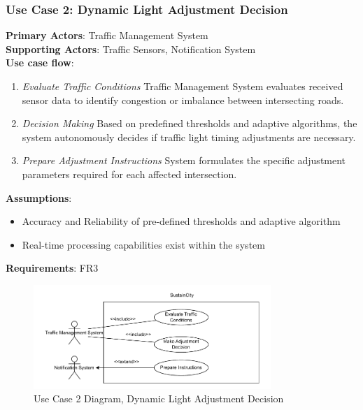 \documentclass[a4paper,12pt]{article}
\begin{document}
\subsubsection*{Use Case 2: Dynamic Light Adjustment Decision}
\textbf{Primary Actors}: Traffic Management System \\
\textbf{Supporting Actors}: Traffic Sensors, Notification System \\
\textbf{Use case flow}: 
\begin{enumerate}
    \item \textit{Evaluate Traffic Conditions} Traffic Management System evaluates received sensor data to identify congestion or imbalance between intersecting roads.
    \item \textit{Decision Making} Based on predefined thresholds and adaptive algorithms, the system autonomously decides if traffic light timing adjustments are necessary.
    \item \textit{Prepare Adjustment Instructions} System formulates the specific adjustment parameters required for each affected intersection.
\end{enumerate}
\textbf{Assumptions}: 
\begin{itemize}
    \item Accuracy and Reliability of pre-defined thresholds and adaptive algorithm
    \item Real-time processing capabilities exist within the system
\end{itemize} 
\textbf{Requirements}: FR3
\\
\begin{figure}[h]
    \centering
    \includegraphics[width=0.8\textwidth]{diagrams/Dynamic_Light_Adjustment_Decision.drawio.pdf}
    \caption{Use Case 2 Diagram, Dynamic Light Adjustment Decision}
    \label{fig:Dynamic_Light_Adjustment_Decision.drawio}
\end{figure}
\\
\end{document}
